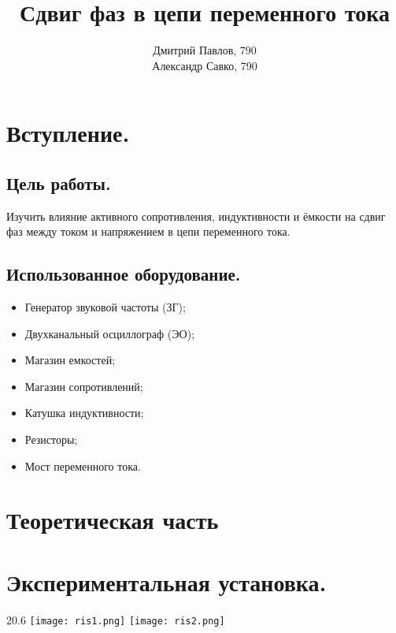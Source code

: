 \documentclass[12pt,a4paper]{article}
\author{Дмитрий Павлов, 790 \\  Александр Савко, 790}
\title {\textbf{Сдвиг фаз в цепи переменного тока}}
\begin{document}
\maketitle
\newpage
\tableofcontents 

\newpage

\section{Вступление.}
    \subsection{Цель работы.}
    Изучить влияние активного сопротивления, индуктивности и ёмкости на сдвиг фаз между током и напряжением в цепи переменного тока.
        
    \subsection{Использованное оборудование.}
        \begin{itemize}
            \item Генератор звуковой частоты (ЗГ);
            \item Двухканальный осциллограф (ЭО);
            \item Магазин емкостей;
            \item Магазин сопротивлений;
            \item Катушка индуктивности;
            \item Резисторы;
            \item Мост переменного тока.
        \end{itemize}
\section{Теоретическая часть}
    
    
\section{Экспериментальная установка.}
     \begin{wrapfigure}{2}{0.6\linewidth}
        \texttt{[image: ris1.png]}
        \hspace{44pt}{Рисунок 1 -- Схема для исследования сдвига фаз между током и напряжением в цепи переменного тока.}
        \texttt{[image: ris2.png]}
        \hspace{44pt}{Рисунок 2 -- Схема фазовращателя.}
    \end{wrapfigure}
        
\end{document}
